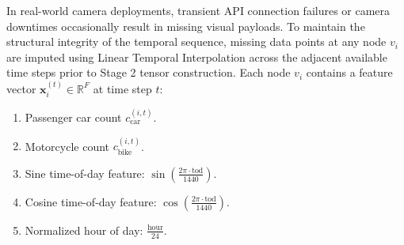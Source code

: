 \documentclass[a4paper,fleqn]{cas-sc}
\begin{document}
In real-world camera deployments, transient API connection failures or camera downtimes occasionally result in missing visual payloads. To maintain the structural integrity of the temporal sequence, missing data points at any node $v_i$ are imputed using Linear Temporal Interpolation across the adjacent available time steps prior to Stage 2 tensor construction. Each node $v_i$ contains a feature vector $\mathbf{x}_{i}^{(t)} \in \mathbb{R}^F$ at time step $t$:
\begin{enumerate}
    \item Passenger car count $c_{\text{car}}^{(i,t)}$.
    \item Motorcycle count $c_{\text{bike}}^{(i,t)}$.
    \item Sine time-of-day feature: $\sin\left(\frac{2\pi \cdot \text{tod}}{1440}\right)$.
    \item Cosine time-of-day feature: $\cos\left(\frac{2\pi \cdot \text{tod}}{1440}\right)$.
    \item Normalized hour of day: $\frac{\text{hour}}{24}$.
\end{enumerate}
\end{document}
